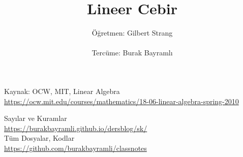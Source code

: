 \documentclass[12pt,a4paper]{report}
\title{Lineer Cebir}
\author{Öğretmen: Gilbert Strang \\ \\ Tercüme: Burak Bayramlı}
\date{}
\begin{document}
\maketitle

\newpage

\begin{figure}[!hbp]
\end{figure}


\begin{center}

\vspace*{3cm}
Kaynak: OCW, MIT, Linear Algebra\\
\vspace{0.5cm}
\url{https://ocw.mit.edu/courses/mathematics/18-06-linear-algebra-spring-2010} %
  
\vspace{0.5cm}
Sayılar ve Kuramlar\\
\vspace{0.5cm}
\url{https://burakbayramli.github.io/dersblog/sk/}\\
\vspace{0.5cm}
Tüm Dosyalar, Kodlar\\
\vspace{0.5cm}
\url{https://github.com/burakbayramli/classnotes}\\
\end{center}
\end{document}
